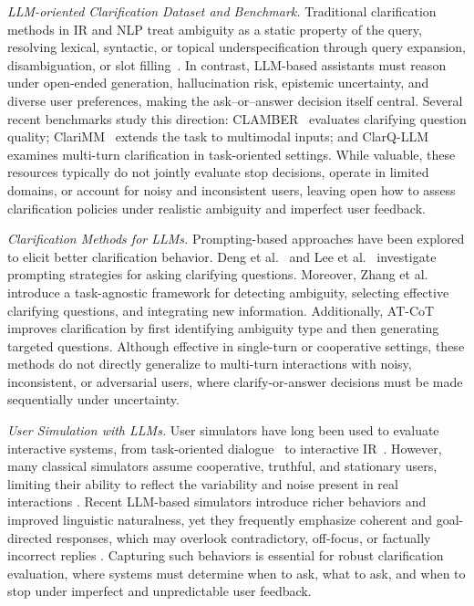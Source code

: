\documentclass[sigconf]{acmart}
\begin{document}
\textit{LLM-oriented Clarification Dataset and Benchmark.}
Traditional clarification methods in IR and NLP treat ambiguity as a static property of the query, resolving lexical, syntactic, or topical underspecification through query expansion, disambiguation, or slot filling~\cite{krovetz1992lexical,navigli2009word}.
In contrast, LLM-based assistants must reason under open-ended generation, hallucination risk, epistemic uncertainty, and diverse user preferences, making the ask–or–answer decision itself central.
Several recent benchmarks study this direction: \textsc{CLAMBER}~\cite{zhang2024clamber} evaluates clarifying question quality; ClariMM~\cite{ramezan2025multi} extends the task to multimodal inputs; and ClarQ-LLM~\cite{gan2024clarq} examines multi-turn clarification in task-oriented settings.
While valuable, these resources typically do not jointly evaluate stop decisions, operate in limited domains, or account for noisy and inconsistent users, leaving open how to assess clarification policies under realistic ambiguity and imperfect user feedback.

\textit{Clarification Methods for LLMs.}
Prompting-based approaches have been explored to elicit better clarification behavior.
Deng et al.~\cite{deng2023prompting} and Lee et al.~\cite{lee2023asking} investigate prompting strategies for asking clarifying questions.
Moreover, Zhang et al.~\cite{zhang2025clarify} introduce a task-agnostic framework for detecting ambiguity, selecting effective clarifying questions, and integrating new information.
Additionally, AT-CoT~\cite{tang2025clarifying} improves clarification by first identifying ambiguity type and then generating targeted questions.
Although effective in single-turn or cooperative settings, these methods do not directly generalize to multi-turn interactions with noisy, inconsistent, or adversarial users, where clarify-or-answer decisions must be made sequentially under uncertainty.

\textit{User Simulation with LLMs.}
User simulators have long been used to evaluate interactive systems, from task-oriented dialogue~\cite{sun2023metaphorical} to interactive IR~\cite{maxwell2016simulating}. However, many classical simulators assume cooperative, truthful, and stationary users, limiting their ability to reflect the variability and noise present in real interactions \cite{wang2024depth}. Recent LLM-based simulators introduce richer behaviors and improved linguistic naturalness, yet they frequently emphasize coherent and goal-directed responses, which may overlook contradictory, off-focus, or factually incorrect replies \cite{sekulic2024reliable,luo2024duetsim}.
Capturing such behaviors is essential for robust clarification evaluation, where systems must determine when to ask, what to ask, and when to stop under imperfect and unpredictable user feedback.
\end{document}

